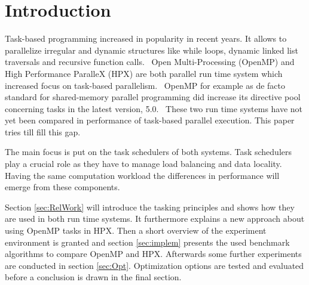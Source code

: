 \section{Introduction}
  Task-based programming increased in popularity in recent years.
  It allows to parallelize irregular and dynamic structures like while loops, dynamic linked list traversals and recursive function calls.~\cite{Ayguade.2009}
  Open Multi-Processing (OpenMP) and High Performance ParalleX (HPX) are both parallel run time system which increased focus on task-based parallelism.~\cite{TheSTEARGroup.2020}
  OpenMP for example as de facto standard for shared-memory parallel programming did increase its directive pool concerning tasks in the latest version, 5.0.~\cite{Zhang.2192020}
  These two run time systems have not yet been compared in performance of task-based parallel execution.
  This paper tries till fill this gap.
  
  The main focus is put on the task schedulers of both systems.
  Task schedulers play a crucial role as they have to manage load balancing and data locality.
  Having the same computation workload the differences in performance will emerge from these components.~\cite{Qawasmeh.2014}
  
  Section \ref{sec:RelWork} will introduce the tasking principles and shows how they are used in both run time systems.
  It furthermore explains a new approach about using OpenMP tasks in HPX.
  Then a short overview of the experiment environment is granted and section \ref{sec:implem} presents the used benchmark algorithms to compare OpenMP and HPX.
  Afterwards some further experiments are conducted in section \ref{sec:Opt}.
  Optimization options are tested and evaluated before a conclusion is drawn in the final section.
